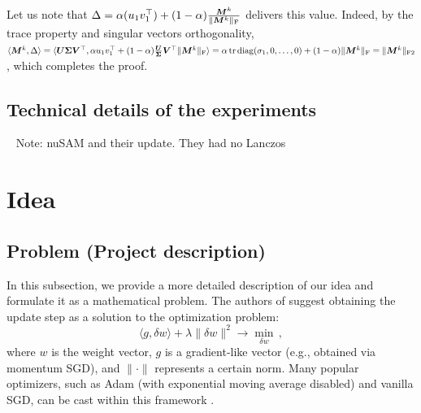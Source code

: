 \documentclass{article} %
\newcommand{\norm}[1]{\lVert #1\rVert}
\DeclarePairedDelimiter{\normf}{\|}{\|_\mathrm{F}}
\DeclarePairedDelimiter{\normftwo}{\|}{\|_\mathrm{F2}}
\def\<#1,#2>{\langle #1,#2\rangle}
\DeclareMathOperator{\tr}{tr}
\DeclareMathOperator{\diag}{diag}
\begin{document}
Let us note that $\Delta = \alpha (u_1 v_1^\top) + (1-\alpha) \frac{\mM^k}{\normf{\mM^k}}$ delivers this value. Indeed, by the trace property and singular vectors orthogonality, $\<\mM^k, \Delta> =\<\mU \mSigma \mV^\top, \alpha u_1 v_1^\top + (1-\alpha) \frac{\mU \mSigma \mV^\top}{\normf{\mM^k}}> = \alpha \tr \diag({\sigma_1, 0, \dots, 0}) + (1-\alpha) \normf{\mM^k} = \normftwo{\mM^k}$, which completes the proof.


\subsection{Technical details of the experiments}
~ Note: nuSAM and their update. They had no Lanczos

\iffalse

\section{Idea}

\subsection{Problem (Project description)}

In this subsection, we provide a more detailed description of our idea and formulate it as a mathematical problem. The authors of \cite{bernstein2024oldoptimizernewnorm} suggest obtaining the update step as a solution to the optimization problem:
\begin{equation}
    \langle g, \delta w \rangle + \lambda \norm{\delta w}^2 \to \min_{\delta w}\,,
\end{equation}
where $w$ is the weight vector, $g$ is a gradient-like vector (e.g., obtained via momentum SGD), and $\norm{\cdot}$ represents a certain norm. Many popular optimizers, such as Adam (with exponential moving average disabled) and vanilla SGD, can be cast within this framework \cite{bernstein2024oldoptimizernewnorm}.
\end{document}
